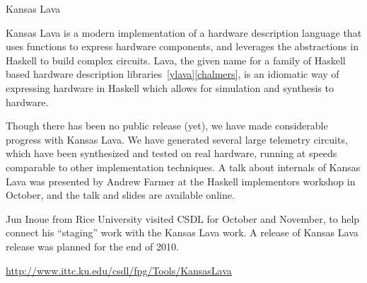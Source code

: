 \begin{hcarentry}{Kansas Lava}
\label{klava}
\makeheader

Kansas Lava is a modern implementation of a hardware description language
that uses functions to express hardware components,
and leverages the abstractions in Haskell to build complex circuits. 
Lava, 
the given name for a family of Haskell based hardware description libraries~\cref{ylava}\cref{chalmers},
is an idiomatic way of expressing hardware in Haskell which allows for simulation and
synthesis to hardware.

Though there has been no public release (yet), we have made considerable
progress with Kansas Lava. We have generated several large telemetry circuits,
which have been synthesized and tested on real hardware, running at speeds
comparable to other implementation techniques.
A talk about internals of Kansas Lava was presented by Andrew Farmer at the
Haskell implementors workshop in October, and the talk and slides are available online.

Jun Inoue from Rice University visited CSDL for October and November, to help
connect his ``staging'' work with the Kansas Lava work.
%
A release of Kansas Lava release was planned for the end of 2010.

\FurtherReading
  \url{http://www.ittc.ku.edu/csdl/fpg/Tools/KansasLava}
\end{hcarentry}
